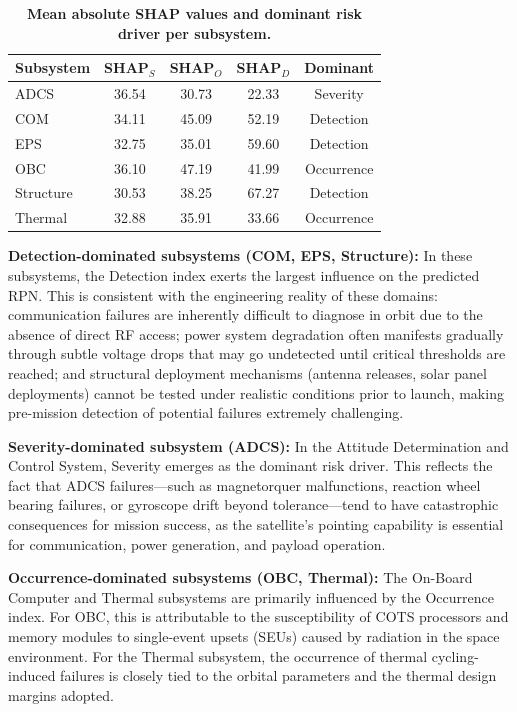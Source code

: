 \begin{table}[h]
\caption{\textbf{Mean absolute SHAP values and dominant risk driver per subsystem.}}
\label{tab:shap_subsystem}
\centering
\begin{tabular}{lcccc}
\hline
\textbf{Subsystem} & \textbf{SHAP$_S$} & \textbf{SHAP$_O$} & \textbf{SHAP$_D$} & \textbf{Dominant} \\
\hline
ADCS      & 36.54 & 30.73 & 22.33 & Severity \\
COM       & 34.11 & 45.09 & 52.19 & Detection \\
EPS       & 32.75 & 35.01 & 59.60 & Detection \\
OBC       & 36.10 & 47.19 & 41.99 & Occurrence \\
Structure & 30.53 & 38.25 & 67.27 & Detection \\
Thermal   & 32.88 & 35.91 & 33.66 & Occurrence \\
\hline
\end{tabular}
\end{table}

\textbf{Detection-dominated subsystems (COM, EPS, Structure):} In these subsystems, the Detection index exerts the largest influence on the predicted RPN. This is consistent with the engineering reality of these domains: communication failures are inherently difficult to diagnose in orbit due to the absence of direct RF access; power system degradation often manifests gradually through subtle voltage drops that may go undetected until critical thresholds are reached; and structural deployment mechanisms (antenna releases, solar panel deployments) cannot be tested under realistic conditions prior to launch, making pre-mission detection of potential failures extremely challenging.

\textbf{Severity-dominated subsystem (ADCS):} In the Attitude Determination and Control System, Severity emerges as the dominant risk driver. This reflects the fact that ADCS failures---such as magnetorquer malfunctions, reaction wheel bearing failures, or gyroscope drift beyond tolerance---tend to have catastrophic consequences for mission success, as the satellite's pointing capability is essential for communication, power generation, and payload operation.

\textbf{Occurrence-dominated subsystems (OBC, Thermal):} The On-Board Computer and Thermal subsystems are primarily influenced by the Occurrence index. For OBC, this is attributable to the susceptibility of COTS processors and memory modules to single-event upsets (SEUs) caused by radiation in the space environment. For the Thermal subsystem, the occurrence of thermal cycling-induced failures is closely tied to the orbital parameters and the thermal design margins adopted.

